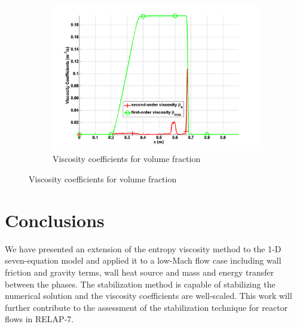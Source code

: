 \documentclass{anstrans}
\begin{document}
\begin{figure}[H]
        \begin{subfigure}[b]{0.495\textwidth}
                \centering
                \includegraphics[width=\textwidth]{plots/relaxation_two_phases_liquid_beta.png}
                \caption{Viscosity coefficients for volume fraction}
                \label{fig:viscosity_coeff_beta}
        \end{subfigure}        
\end{figure}
%
\section{Conclusions}

We have presented an extension of the entropy viscosity method to the 1-D seven-equation model and applied it to a low-Mach flow case including wall friction and gravity terms, wall heat source and mass and energy transfer between the phases. The stabilization method is capable of stabilizing the numerical solution and the viscosity coefficients are well-scaled. This work will further contribute to the assessment of the stabilization technique for reactor flows in RELAP-7.





\end{document}

